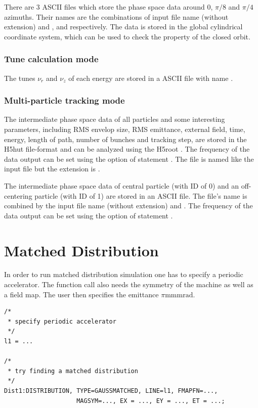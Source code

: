 There are 3 ASCII files which store the phase space data around $0$, $\pi/8$ and $\pi/4$ azimuths.
Their names are the combinations of input file name (without extension) and ,  and  respectively.
The data is stored in the global cylindrical coordinate system, which can be used to check the property of the closed orbit.

\subsubsection{Tune calculation mode}

 The tunes $\nu_r$ and $\nu_z$ of each energy are stored in a ASCII file with name .

\subsubsection{Multi-particle tracking mode}

The intermediate phase space data of all particles and some interesting parameters,
including RMS envelop size, RMS emittance, external field, time, energy, length of path, number of bunches and
tracking step, are stored in the H5hut file-format \cite{bib:howison2010} and can be analyzed
using the H5root \cite{bib:schietinger}.
The frequency of the data output can be set using the   option of  statement .
The file is named like the input file but the extension is .

The intermediate phase space data of central particle (with ID of 0) and an off-centering particle (with ID of 1)
are stored in an ASCII file. The file's name is combined by the input file name (without extension) and .
The frequency of the data output can be set using the  option of  statement .



\section{Matched Distribution}
In order to run matched distribution simulation one has to specify a periodic accelerator. The function call also needs
the symmetry of the machine as well as a field map. The user then specifies the emittance $\pi\si{\milli\meter\milli\radian}$.
\begin{verbatim}
/*
 * specify periodic accelerator
 */
l1 = ...

/*
 * try finding a matched distribution
 */
Dist1:DISTRIBUTION, TYPE=GAUSSMATCHED, LINE=l1, FMAPFN=...,
                    MAGSYM=..., EX = ..., EY = ..., ET = ...;
\end{verbatim}
